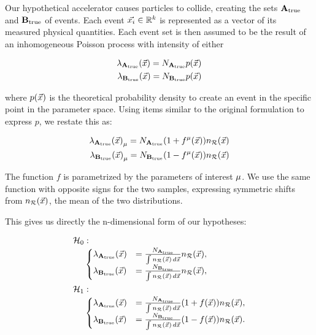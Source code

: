 \documentclass[paper/ddppaper2.tex]{subfiles}
\begin{document}
Our hypothetical accelerator causes particles to collide, creating the sets ${{\mathbf{A}}}_{\text{true}}$ and ${{\mathbf{B}}}_{\text{true}}$ of events. Each event ${\vec{{x}_i}} \in \mathbb{R}^k$ is represented as a vector of its measured physical quantities. Each event set is then assumed to be the result of an inhomogeneous Poisson process with intensity of either

\begin{equation}   
\begin{aligned}
    {{\lambda}_{{{\mathbf{A}}}_{\text{true}}}(\vec{{x}})}={N_{{{\mathbf{A}}}_{\text{true}}}} p(\vec{{x}})\\
    {{\lambda}_{{{\mathbf{B}}}_{\text{true}}}(\vec{{x}})}={N_{{{\mathbf{B}}}_{\text{true}}}} p(\vec{{x}})
\end{aligned}
\end{equation}

\noindent where $p(\vec{{x}})$ is the theoretical probability density to create an event in the specific point in the parameter space. Using items similar to the original formulation to express $p$, we restate this as:

\begin{eqnarray}
\label{eq:process_probability_distribution}
\begin{aligned}
    \dist{\true{A}}_\param = N_{\true{A}} (1+{\paramf(\anyevent)}) \refdist \\
    \dist{\true{B}}_\param = N_{\true{B}} (1-{\paramf(\anyevent)}) \refdist
\end{aligned}
\end{eqnarray}

\noindent The function $f$ is parametrized by the parameters of interest ${\mu}$. We use the same function with opposite signs for the two samples, expressing symmetric shifts from $n_{\mathcal{R}}({\vec{{x}}})$, the mean of the two distributions.

This gives us directly the n-dimensional form of our hypotheses:

\begin{equation}
\label{eq:learnable_distribution}
\begin{aligned}
    \nullhypothesis &:\\[-0.5ex]
    &\begin{cases}
        \dist{\true{A}}
        &=
        \frac{N_{\true{A}}}
            {\int \refdist\,d\anyevent}
        \refdist,
        \\
        \dist{\true{B}}
        &=
        \frac{N_{\true{B}}}
            {\int \refdist\,d\anyevent}
        \refdist,
    \end{cases} \\
    \hypothesis{1} &:\\[-0.5ex]
    &\begin{cases}
        \dist{\true{A}}
        &=
        \frac{N_{\true{A}}}
            {\int \refdist\,d\anyevent}
        (1 + f(\anyevent)) \refdist,
        \\
        \dist{\true{B}}
        &=
        \frac{N_{\true{B}}}
            {\int \refdist\,d\anyevent}
        (1 - f(\anyevent)) \refdist.
    \end{cases}
\end{aligned}
\end{equation}
\end{document}
